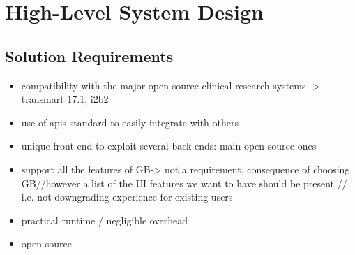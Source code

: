 
\chapter{High-Level System Design}

\label{sec:sysdesign}



\section{Solution Requirements}
\label{sec:requirements}

\begin{itemize}
    \item compatibility with the major open-source clinical research systems -> transmart 17.1, i2b2
    \item use of apis standard to easily integrate with others
    \item unique front end to exploit several back ends: main open-source ones
    \item support all the features of GB-> not a requirement, consequence of choosing GB//however a list of the UI features we want to have should be present // i.e. not downgrading experience for existing users
    \item practical runtime / negligible overhead
    \item open-source
\end{itemize}





